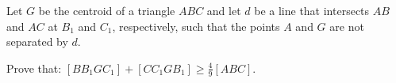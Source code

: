 Let $G$ be the centroid of a triangle $ABC$ and let $d$ be a line that intersects $AB$ and $AC$ at $B_{1}$ and $C_{1}$,  respectively, such that the points $A$ and $G$ are not separated by $d$.

Prove that: $[BB_{1}GC_{1}]+[CC_{1}GB_{1}] \geq  \frac{4}{9}[ABC]$.